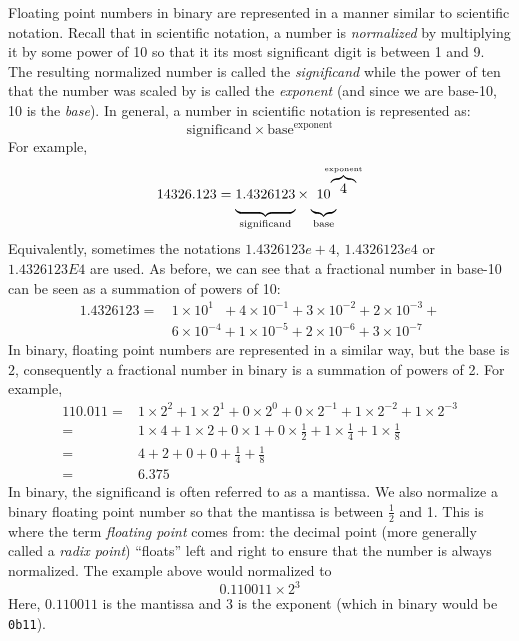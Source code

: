 Floating point numbers in binary are represented in a manner similar
to scientific notation.  Recall that in scientific notation, a number is \emph{normalized}
by multiplying it by some power of 10 so that it its most significant digit is between 1
and 9.  The resulting normalized number is called the \emph{significand} while the
power of ten that the number was scaled by is called the \emph{exponent} (and
since we are base-10, 10 is the \emph{base}).  In general, a number in scientific
notation is represented as:
$$\text{significand} \times \text{base}^\text{exponent}$$
For example, 
$$14326.123 = \underbrace{ \vphantom{\frac{A}{B}} 1.4326123}_\text{significand} \times \underbrace{ \vphantom{\frac{A}{B}} 10}_\text{base}\!\!\!\!\!\!^{\overbrace{4}^\text{exponent}}$$
Equivalently, sometimes the notations $1.4326123e+4$, $1.4326123e4$ or 
$1.4326123E4$ are used.  As before, we can see that a fractional number in base-10
can be seen as a summation of powers of 10:
\begin{align*}
  1.4326123 = \, & 1 \times 10^{1\,\,\,\,\,} + 4 \times 10^{-1} + 3 \times 10^{-2} + 2 \times 10^{-3} + \\
  	& 6 \times 10^{-4} + 1 \times 10^{-5} + 2 \times 10^{-6} + 3 \times 10^{-7} 
\end{align*}
In binary, floating point numbers are represented in a similar way, but the
base is $2$, consequently a fractional number in binary is a summation of
powers of 2.  For example, 
\begin{align*}
    110.011 = & 1 \times 2^2 + 1 \times 2^1 + 0 \times 2^0 + 0 \times 2^{-1} + 1 \times 2^{-2} + 1 \times 2^{-3} \\
            = & 1 \times 4 + 1 \times 2 + 0 \times 1 + 0 \times \frac{1}{2} + 1 \times \frac{1}{4} + 1 \times \frac{1}{8} \\
            = & 4 + 2 + 0 + 0 + \frac{1}{4} + \frac{1}{8} \\
            = & 6.375
\end{align*}
In binary, the significand is often referred to as a \gls{mantissa}.  We also 
normalize a binary floating point number so that the mantissa is between $\frac{1}{2}$ and 1.  
This is where the term \emph{floating point} comes from: the decimal point (more generally
called a \emph{radix point}) ``floats'' left and right to ensure that the number is always 
normalized.  The example above would normalized to 
  $$0.110011 \times 2^{3}$$
Here, $0.110011$ is the mantissa and $3$ is the exponent (which in binary would 
be \texttt{0b11}).


